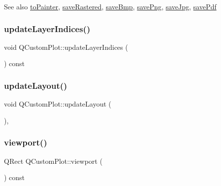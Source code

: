 \begin{DoxySeeAlso}{See also}
\mbox{\hyperlink{class_q_custom_plot_a1be68d5c0f1e086d6374d1340a193fb9}{to\+Painter}}, \mbox{\hyperlink{class_q_custom_plot_ad7723ce2edfa270632ef42b03a444352}{save\+Rastered}}, \mbox{\hyperlink{class_q_custom_plot_ae3a86ed0795670e50afa21759d4fa13d}{save\+Bmp}}, \mbox{\hyperlink{class_q_custom_plot_ac92cc9256d12f354b40a4be4600b5fb9}{save\+Png}}, \mbox{\hyperlink{class_q_custom_plot_a76f0d278e630a711fa6f48048cfd83e4}{save\+Jpg}}, \mbox{\hyperlink{class_q_custom_plot_ad5acd34f6b39c3516887d7e54fec2412}{save\+Pdf}} 
\end{DoxySeeAlso}
\mbox{\label{class_q_custom_plot_a7f1ca67a66d37b6d260a0b93de08f3bd}} 
\subsubsection{\texorpdfstring{updateLayerIndices()}{updateLayerIndices()}}
{\footnotesize\ttfamily void Q\+Custom\+Plot\+::update\+Layer\+Indices (\begin{DoxyParamCaption}{ }\end{DoxyParamCaption}) const\hspace{0.3cm}{\ttfamily [protected]}}

\mbox{\label{class_q_custom_plot_a6e6693e2c249f65437382ffd93405e04}} 
\subsubsection{\texorpdfstring{updateLayout()}{updateLayout()}}
{\footnotesize\ttfamily void Q\+Custom\+Plot\+::update\+Layout (\begin{DoxyParamCaption}{ }\end{DoxyParamCaption})\hspace{0.3cm}{\ttfamily [protected]}, {\ttfamily [virtual]}}

\mbox{\label{class_q_custom_plot_a19842409b18f556b256d05e97fffc670}} 
\subsubsection{\texorpdfstring{viewport()}{viewport()}}
{\footnotesize\ttfamily Q\+Rect Q\+Custom\+Plot\+::viewport (\begin{DoxyParamCaption}{ }\end{DoxyParamCaption}) const\hspace{0.3cm}{\ttfamily [inline]}}


